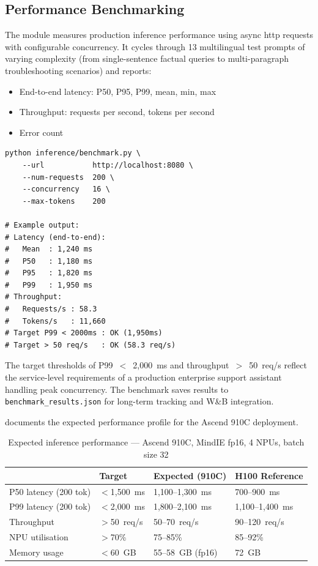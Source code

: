 \subsection{Performance Benchmarking}
\label{sec:perf-benchmark}

The  module measures production
inference performance using async \acrshort{http} requests with
configurable concurrency. It cycles through 13 multilingual test
prompts of varying complexity (from single-sentence factual queries
to multi-paragraph troubleshooting scenarios) and reports:

\begin{itemize}
  \item End-to-end latency: P50, P95, P99, mean, min, max
  \item Throughput: requests per second, tokens per second
  \item Error count
\end{itemize}

\begin{lstlisting}[style=Bash,
  caption={Benchmark execution and example output},
  label={lst:benchmark-cmd}]
python inference/benchmark.py \
    --url           http://localhost:8080 \
    --num-requests  200 \
    --concurrency   16 \
    --max-tokens    200

# Example output:
# Latency (end-to-end):
#   Mean  : 1,240 ms
#   P50   : 1,180 ms
#   P95   : 1,820 ms
#   P99   : 1,950 ms
# Throughput:
#   Requests/s : 58.3
#   Tokens/s   : 11,660
# Target P99 < 2000ms : OK (1,950ms)
# Target > 50 req/s   : OK (58.3 req/s)
\end{lstlisting}

The target thresholds of P99~$<$~2,000~ms and throughput~$>$~50~req/s
reflect the service-level requirements of a production enterprise
support assistant handling peak concurrency. The benchmark saves
results to \texttt{benchmark\_results.json} for long-term tracking
and W\&B integration.

\tabref{expected-perf} documents the expected performance profile
for the Ascend 910C deployment.

\begin{table}[htbp]
  \centering
  \caption{Expected inference performance — Ascend 910C, MindIE fp16,
           4 NPUs, batch size 32}
  \label{tab:expected-perf}
  \begin{tabularx}{\textwidth}{lXXX}
    \toprule
    \tableheader{Metric & Target & Expected (910C) & H100 Reference} \\
    \midrule
    P50 latency (200 tok)
      & $<$1,500~ms & 1,100--1,300~ms & 700--900~ms \\
    \rowcolor{TableRowOdd}
    P99 latency (200 tok)
      & $<$2,000~ms & 1,800--2,100~ms & 1,100--1,400~ms \\
    Throughput
      & $>$50~req/s & 50--70~req/s & 90--120~req/s \\
    \rowcolor{TableRowOdd}
    NPU utilisation
      & $>$70\%     & 75--85\%       & 85--92\% \\
    Memory usage
      & $<$60~GB    & 55--58~GB (fp16) & 72~GB \\
    \bottomrule
  \end{tabularx}
\end{table}
